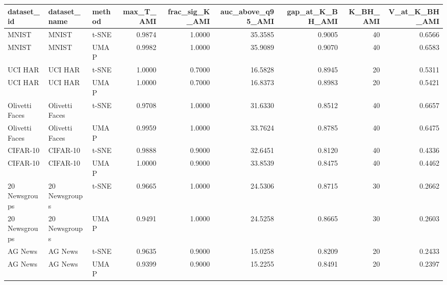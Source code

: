 \begin{tabular}{lllrrrrrr}
\toprule
dataset_id & dataset_name & method & max_T_AMI & frac_sig_K_AMI & auc_above_q95_AMI & gap_at_K_BH_AMI & K_BH_AMI & V_at_K_BH_AMI \\
\midrule
MNIST & MNIST & t-SNE & 0.9874 & 1.0000 & 35.3585 & 0.9005 & 40 & 0.6566 \\
MNIST & MNIST & UMAP & 0.9982 & 1.0000 & 35.9089 & 0.9070 & 40 & 0.6583 \\
UCI HAR & UCI HAR & t-SNE & 1.0000 & 0.7000 & 16.5828 & 0.8945 & 20 & 0.5311 \\
UCI HAR & UCI HAR & UMAP & 1.0000 & 0.7000 & 16.8373 & 0.8983 & 20 & 0.5421 \\
Olivetti Faces & Olivetti Faces & t-SNE & 0.9708 & 1.0000 & 31.6330 & 0.8512 & 40 & 0.6657 \\
Olivetti Faces & Olivetti Faces & UMAP & 0.9959 & 1.0000 & 33.7624 & 0.8785 & 40 & 0.6475 \\
CIFAR-10 & CIFAR-10 & t-SNE & 0.9888 & 0.9000 & 32.6451 & 0.8120 & 40 & 0.4336 \\
CIFAR-10 & CIFAR-10 & UMAP & 1.0000 & 0.9000 & 33.8539 & 0.8475 & 40 & 0.4462 \\
20 Newsgroups & 20 Newsgroups & t-SNE & 0.9665 & 1.0000 & 24.5306 & 0.8715 & 30 & 0.2662 \\
20 Newsgroups & 20 Newsgroups & UMAP & 0.9491 & 1.0000 & 24.5258 & 0.8665 & 30 & 0.2603 \\
AG News & AG News & t-SNE & 0.9635 & 0.9000 & 15.0258 & 0.8209 & 20 & 0.2433 \\
AG News & AG News & UMAP & 0.9399 & 0.9000 & 15.2255 & 0.8491 & 20 & 0.2397 \\
\bottomrule
\end{tabular}
